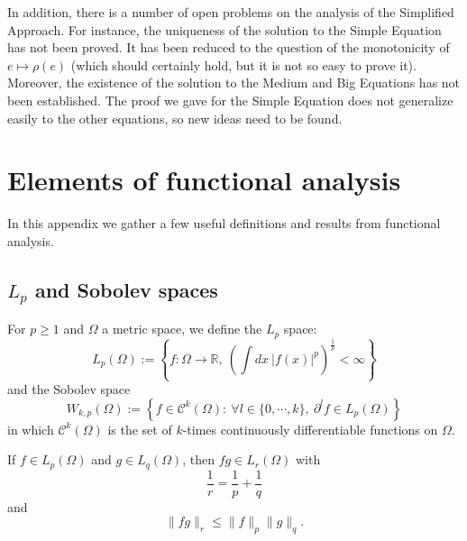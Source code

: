 \documentclass{ian}
\begin{document}
\indent
In addition, there is a number of open problems on the analysis of the Simplified Approach.
For instance, the uniqueness of the solution to the Simple Equation has not been proved.
It has been reduced to the question of the monotonicity of $e\mapsto\rho(e)$ (which should certainly hold, but it is not so easy to prove it).
Moreover, the existence of the solution to the Medium and Big Equations has not been established.
The proof we gave for the Simple Equation does not generalize easily to the other equations, so new ideas need to be found.


\vfill
\eject

\appendix

\section{Elements of functional analysis}\label{app:functional_analysis}
\indent
In this appendix we gather a few useful definitions and results from functional analysis.
\bigskip

\subsection{$L_p$ and Sobolev spaces}\label{app:sobolev}

  For $p\geqslant 1$ and $\Omega$ a metric space, we define the $L_p$ space:
  \begin{equation}
    L_p(\Omega):=\left\{f:\Omega\to\mathbb R,\ \left(\int dx\ |f(x)|^p\right)^{\frac1p}<\infty\right\}
  \end{equation}
  and the Sobolev space
  \begin{equation}
    W_{k,p}(\Omega):=
    \left\{f\in\mathcal C^k(\Omega):\ \forall l\in\{0,\cdots,k\},\ \partial^lf\in L_p(\Omega)\right\}
  \end{equation}
  in which $\mathcal C^k(\Omega)$ is the set of $k$-times continuously differentiable functions on $\Omega$.
\endtheo
\bigskip

\label{theo:holder}
  If $f\in L_p(\Omega)$ and $g\in L_q(\Omega)$, then $fg\in L_r(\Omega)$ with
  \begin{equation}
    \frac1r=\frac1p+\frac 1q
  \end{equation}
  and
  \nopagebreakaftereq
  \begin{equation}
    \|fg\|_r\leqslant \|f\|_p\|g\|_q
    .
  \end{equation}
\endtheo
\restorepagebreakaftereq
\bigskip
\end{document}
